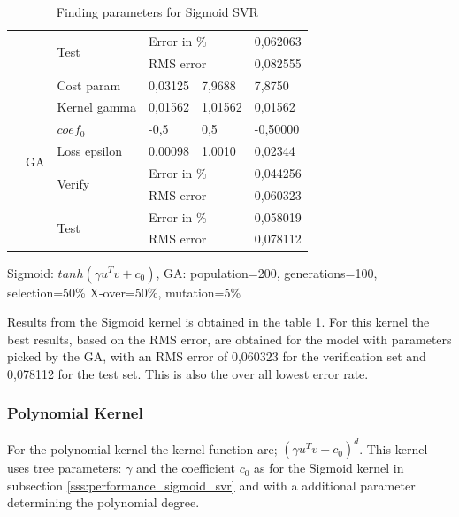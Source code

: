 \begin{table}[H]
\begin{threeparttable}
\begin{tabular}{ | l | l | l | l | l | l | }
& & \multirow{2}{*}{Test} & \multicolumn{2}{l|}{Error in \%} & 0,062063 \\
& & & \multicolumn{2}{l|}{RMS error} & 0,082555 \\
\cline{2-6}
& \multirow{8}{*}{GA} & Cost param & 0,03125 & 7,9688 & 7,8750 \\
& & Kernel gamma & 0,01562 & 1,01562 & 0,01562 \\  
& & $coef_{0}$ & -0,5 & 0,5 & -0,50000 \\
& & Loss epsilon & 0,00098 & 1,0010 & 0,02344 \\ 
\cline{3-6}
& & \multirow{2}{*}{Verify} & \multicolumn{2}{l|}{Error in \%} & 0,044256 \\
& & & \multicolumn{2}{l|}{RMS error} & 0,060323 \\
\cline{3-6}
& & \multirow{2}{*}{Test} & \multicolumn{2}{l|}{Error in \%} & 0,058019 \\
& & & \multicolumn{2}{l|}{RMS error} & 0,078112 \\
\hline
\end{tabular}
\begin{tablenotes}
      \small
      \item Sigmoid: $tanh(\gamma u^{T} v + c_{0})$, GA: population=200, generations=100, selection=50\% X-over=50\%, mutation=5\%
\end{tablenotes}
\caption{Finding parameters for Sigmoid SVR}
\label{tab:params_svr_sigmoid}
\end{threeparttable}
\end{table}

Results from the Sigmoid kernel is obtained in the table \ref{tab:params_svr_sigmoid}. For this kernel the best results, based on the RMS error, are obtained for the model with parameters picked by the GA, with an RMS error of 0,060323 for the verification set and 0,078112 for the test set. This is also the over all lowest error rate. 

\subsubsection{Polynomial Kernel} \label{sss:performance_poly_svr}
For the polynomial kernel the kernel function are; $(\gamma u^{T} v + c_{0})^{d}$. This kernel uses tree parameters: $\gamma$ and the coefficient $c_{0}$ as for the Sigmoid kernel in subsection \ref{sss:performance_sigmoid_svr} and with a additional parameter determining the polynomial degree.

